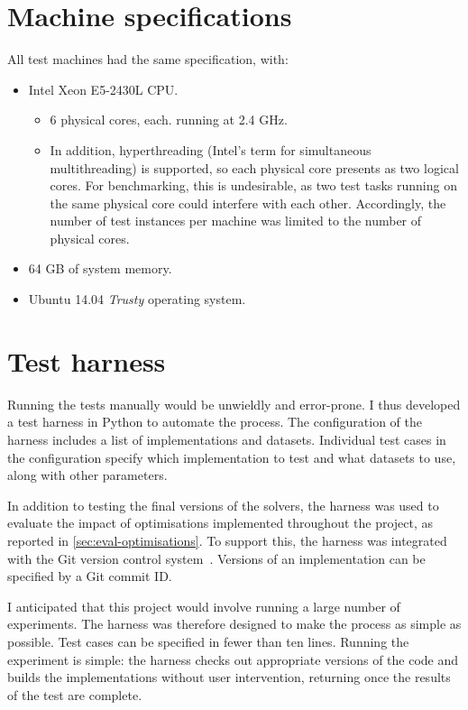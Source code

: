 \section{Machine specifications} \label{appendix:test-machine-spec}

All test machines had the same specification, with:
\begin{itemize}
    \item Intel Xeon E5-2430L CPU.
    \begin{itemize}
        \item 6 physical cores, each. running at 2.4 GHz.
        \item In addition, hyperthreading (Intel's term for simultaneous multithreading) is supported, so each physical core presents as two logical cores. For benchmarking, this is undesirable, as two test tasks running on the same physical core could interfere with each other. Accordingly, the number of test instances per machine was limited to the number of physical cores.
    \end{itemize}
    \item 64 GB of system memory.
    \item Ubuntu 14.04 \textit{Trusty} operating system.
\end{itemize}

\section{Test harness} \label{appendix:impl-benchmark-harness}

Running the tests manually would be unwieldly and error-prone. I thus developed a test harness in Python to automate the process. The configuration of the harness includes a list of implementations and datasets. Individual test cases in the configuration specify which implementation to test and what datasets to use, along with other parameters.

In addition to testing the final versions of the solvers, the harness was used to evaluate the impact of optimisations implemented throughout the project, as reported in \cref{sec:eval-optimisations}. To support this, the harness was integrated with the Git version control system~\cite{GitWWW}. Versions of an implementation can be specified by a Git commit ID.

I anticipated that this project would involve running a large number of experiments. The harness was therefore designed to make the process as simple as possible. Test cases can be specified in fewer than ten lines. Running the experiment is simple: the harness checks out appropriate versions of the code and builds the implementations without user intervention, returning once the results of the test are complete.


